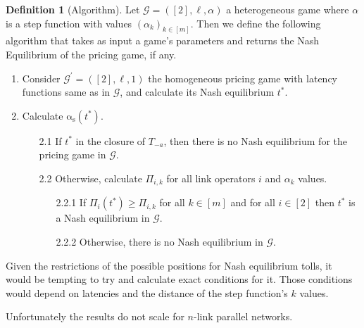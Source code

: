 \documentclass[10pt,a4paper]{book}
\newcommand{\as}{\mathrm{\alpha_s}}
\newcommand{\Gm}{\mathcal{G}}
\theoremstyle{definition}
\newtheorem{definition}{Definition}[chapter]
\newtheorem{lemma}[definition]{Lemma}
\theoremstyle{comment}
\begin{document}
\begin{definition}[Algorithm]
	Let $\Gm = ([2], \ell, \alpha)$ a heterogeneous game where $\alpha$ is a step function with values $(\alpha_k)_{k \in [m]}$.
	Then we define the following algorithm that takes as input a game's parameters and returns the Nash Equilibrium of the pricing game, if any.
	\begin{enumerate}
		\item Consider $\Gm^\prime = ([2], \ell, 1)$ the homogeneous pricing game with latency functions same as in $\Gm$, and calculate its Nash equilibrium $t^*$.
		\item Calculate $\as(t^*)$.
		\begin{enumerate}
			\item[2.1] If $t^*$ in the closure of $T_{-a}$, then there is no Nash equilibrium for the pricing game in $\Gm$.
			\item[2.2] Otherwise, calculate $\Pi_{i, k}$ for all link operators $i$ and $\alpha_k$ values.
			\begin{enumerate}
				\item[2.2.1] If $\Pi_i(t^*) \ge \Pi_{i, k}$ for all $k \in [m]$ and for all $i \in [2]$ then $t^*$ is a Nash equilibrium in $\Gm$.
				\item[2.2.2] Otherwise, there is no Nash equilibrium in $\Gm$.
			\end{enumerate}
		\end{enumerate}
	\end{enumerate}
\end{definition}

Given the restrictions of the possible positions for Nash equilibrium tolls, it would be tempting to try and calculate exact conditions for it.
Those conditions would depend on latencies and the distance of the step function's $k$ values.

Unfortunately the results do not scale for $n$-link parallel networks.

\end{document}
